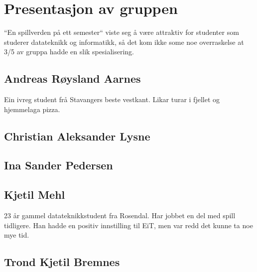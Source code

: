 \section{Presentasjon av gruppen}
``En spillverden på ett semester`` viste seg å være attraktiv for
studenter som studerer datateknikk og informatikk, så det kom ikke some
noe overraskelse at 3/5 av gruppa hadde en slik spesialisering.

\subsection{Andreas Røysland Aarnes}
Ein ivreg student frå Stavangers beste vestkant. Likar turar i fjellet og hjemmelaga pizza. 
\subsection{Christian Aleksander Lysne}

\subsection{Ina Sander Pedersen}

\subsection{Kjetil Mehl}
23 år gammel datateknikkstudent fra Rosendal. Har jobbet en del med
spill tidligere. Han hadde en positiv innstilling til EiT, men var
redd det kunne ta noe mye tid.

\subsection{Trond Kjetil Bremnes}
